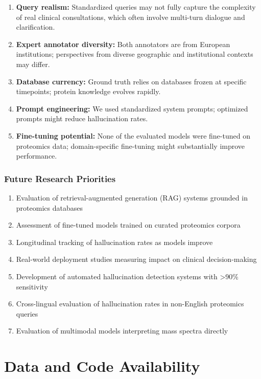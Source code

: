 \documentclass[11pt,a4paper]{article}
\begin{document}
\begin{enumerate}
    \item \textbf{Query realism:} Standardized queries may not fully capture the complexity of real clinical consultations, which often involve multi-turn dialogue and clarification.

    \item \textbf{Expert annotator diversity:} Both annotators are from European institutions; perspectives from diverse geographic and institutional contexts may differ.

    \item \textbf{Database currency:} Ground truth relies on databases frozen at specific timepoints; protein knowledge evolves rapidly.

    \item \textbf{Prompt engineering:} We used standardized system prompts; optimized prompts might reduce hallucination rates.

    \item \textbf{Fine-tuning potential:} None of the evaluated models were fine-tuned on proteomics data; domain-specific fine-tuning might substantially improve performance.
\end{enumerate}

\subsubsection{Future Research Priorities}

\begin{enumerate}
    \item Evaluation of retrieval-augmented generation (RAG) systems grounded in proteomics databases
    \item Assessment of fine-tuned models trained on curated proteomics corpora
    \item Longitudinal tracking of hallucination rates as models improve
    \item Real-world deployment studies measuring impact on clinical decision-making
    \item Development of automated hallucination detection systems with >90\% sensitivity
    \item Cross-lingual evaluation of hallucination rates in non-English proteomics queries
    \item Evaluation of multimodal models interpreting mass spectra directly
\end{enumerate}

\section{Data and Code Availability}
\end{document}
